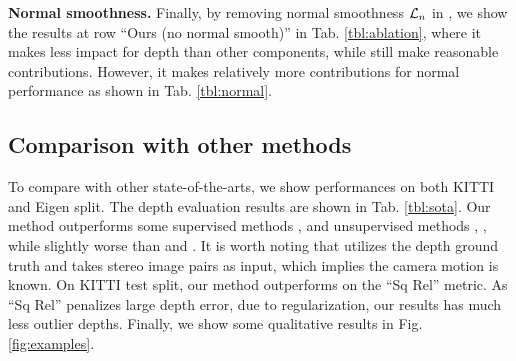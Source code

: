\textbf{Normal smoothness.} Finally, by removing normal smoothness ${\mathcal L}_n$ in , we show the results at row ``Ours (no normal smooth)'' in Tab. \ref{tbl:ablation}, where it makes less impact for depth than other components, while still make reasonable contributions. However, it makes relatively more contributions for normal performance as shown in Tab. \ref{tbl:normal}.


\vspace{-0.6\baselineskip}
\subsection{Comparison with other methods}
\vspace{-0.3\baselineskip}

To compare with other state-of-the-arts, we show performances on both KITTI and Eigen split. The depth evaluation results are shown in Tab. \ref{tbl:sota}. Our method outperforms some supervised methods \eg \cite{eigen2014depth}, \cite{liu2016learning} and unsupervised methods \cite{zhou2017unsupervised}, \cite{kuznietsov2017semi}, while slightly worse than \cite{godard2016unsupervised} and \cite{kuznietsov2017semi}. It is worth noting that \cite{kuznietsov2017semi} utilizes the depth ground truth and \cite{godard2016unsupervised} takes stereo image pairs as input, which implies the camera motion is known. On KITTI test split, our method outperforms \cite{godard2016unsupervised} on the ``Sq Rel'' metric. As ``Sq Rel'' penalizes large depth error, due to regularization, our results has much less outlier depths. Finally, we show some qualitative results in Fig. \ref{fig:examples}.

